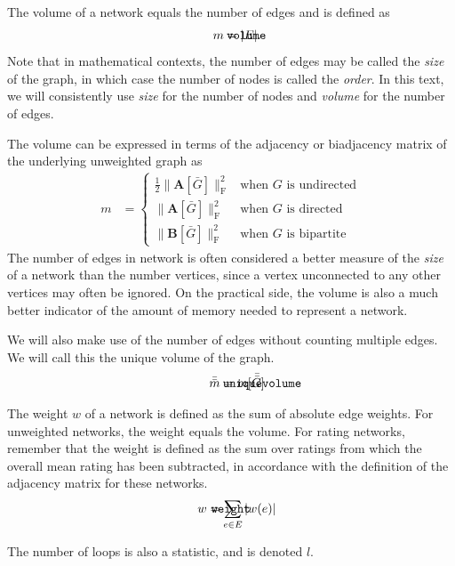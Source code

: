 \documentclass{article}
\def\mathnote#1{%
  \tag*{\rlap{\hspace\marginparsep\smash{\parbox[t]{\marginparwidth}{#1}}}}
}
\begin{document}
The volume of a network equals the number of edges and is defined as 
\begin{align}
  \mathnote{\texttt{volume}}
  m &= |E|. 
\end{align}
Note that in mathematical contexts, the number of edges may be called
the \emph{size} of the graph, in which case the number of nodes is
called the \emph{order}.  In this text, we will consistently use
\emph{size} for the number of nodes and \emph{volume} for the number of
edges. 

The volume can be expressed in terms of
the adjacency or biadjacency matrix of the underlying unweighted graph as
\begin{align}
  m &= \left\{ \begin{array}{ll}
    \frac 1 2 \| \mathbf A[\bar G] \|_{\mathrm F} ^2 &
    \text{when $G$ is undirected} \\
    \| \mathbf A[\bar G] \| _{\mathrm F} ^2 &
    \text{when $G$ is directed} \\
    \| \mathbf B[\bar G] \| _{\mathrm F} ^2 &    
    \text{when $G$ is bipartite}
    \end{array} \right.
\end{align}
The number of edges in network is often considered a better measure of
the \emph{size} of a network than the number vertices, since a vertex
unconnected to any other vertices may often be ignored.  On the
practical side, the volume is also a much better indicator of the amount
of memory needed to represent a network.

We will also make use of the number of edges without counting multiple
edges.  We will call this the unique volume of the graph. 
\begin{align}
  \mathnote{\texttt{uniquevolume}}
  \bar{\bar m} &= m[\bar{\bar{G}}]
\end{align}

The weight $w$ of a network is defined as the sum of absolute edge weights.  For
unweighted networks, the weight equals the volume. For rating networks,
remember that the weight is defined as the sum over ratings from which the overall
mean rating has been subtracted, in accordance with the definition of
the adjacency matrix for these networks. 
\begin{align}
  \mathnote{\texttt{weight}}
  w &= \sum_{e \in E} |w(e)|
\end{align}

The number of loops is also a statistic, and is denoted
$l$.  
\end{document}
